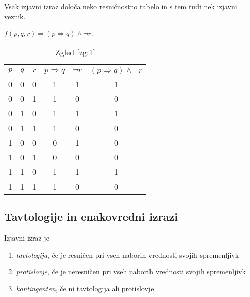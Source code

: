 \documentclass[12pt, a4paper]{article}
\renewcommand{\implies}{\Rightarrow}
\begin{document}
Vsak izjavni izraz določa neko resničnostno tabelo in s tem tudi nek izjavni veznik.

\begin{zgled}\label{zg:1}
$f(p, q, r)=(p\implies q)\land\neg r$:

\begin{table}[H]
\centering
\begin{tabular}{ccc||ccc}
$p$ & $q$ & $r$ & $p\implies q$ & $\neg r$ & $(p\implies q)\land\neg r$ \\
\hline\hline
0 & 0 & 0 & 1 & 1 & 1 \\
0 & 0 & 1 & 1 & 0 & 0 \\
0 & 1 & 0 & 1 & 1 & 1 \\
0 & 1 & 1 & 1 & 0 & 0 \\
1 & 0 & 0 & 0 & 1 & 0 \\
1 & 0 & 1 & 0 & 0 & 0 \\
1 & 1 & 0 & 1 & 1 & 1 \\
1 & 1 & 1 & 1 & 0 & 0 \\
\end{tabular} 
\caption{Zgled \ref{zg:1}}
\end{table}
\end{zgled}

\newpage

\subsection{Tavtologije in enakovredni izrazi}

\begin{okvir}
\begin{definicija}
Izjavni izraz je

\begin{enumerate}
\item \emph{tavtologija}, če je resničen pri vseh naborih vrednosti svojih spremenljivk
\item \emph{protislovje}, če je neresničen pri vseh naborih vrednosti svojih spremenljivk
\item \emph{kontingenten}, če ni tavtologija ali protislovje
\end{enumerate}
\end{definicija}
\end{okvir}
\end{document}
